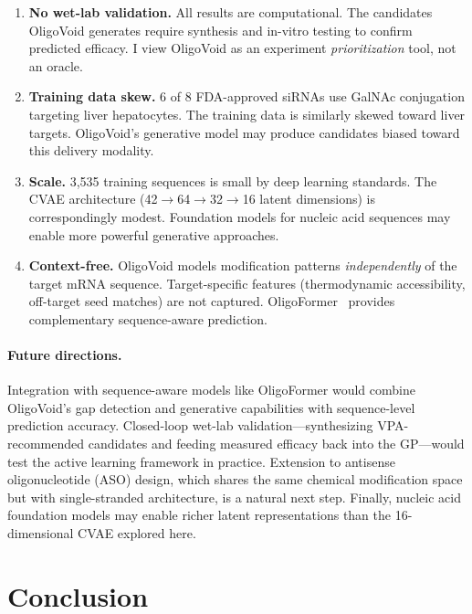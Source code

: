 \documentclass{article}
\begin{document}
\begin{enumerate}
  \item \textbf{No wet-lab validation.} All results are computational. The candidates OligoVoid generates require synthesis and in-vitro testing to confirm predicted efficacy. I view OligoVoid as an experiment \emph{prioritization} tool, not an oracle.
  \item \textbf{Training data skew.} 6 of 8 FDA-approved siRNAs use GalNAc conjugation targeting liver hepatocytes. The training data is similarly skewed toward liver targets. OligoVoid's generative model may produce candidates biased toward this delivery modality.
  \item \textbf{Scale.} 3,535 training sequences is small by deep learning standards. The CVAE architecture (42$\to$64$\to$32$\to$16 latent dimensions) is correspondingly modest. Foundation models for nucleic acid sequences may enable more powerful generative approaches.
  \item \textbf{Context-free.} OligoVoid models modification patterns \emph{independently} of the target mRNA sequence. Target-specific features (thermodynamic accessibility, off-target seed matches) are not captured. OligoFormer~\citep{oligoformer2024} provides complementary sequence-aware prediction.
\end{enumerate}

\paragraph{Future directions.}
Integration with sequence-aware models like OligoFormer would combine OligoVoid's gap detection and generative capabilities with sequence-level prediction accuracy. Closed-loop wet-lab validation---synthesizing VPA-recommended candidates and feeding measured efficacy back into the GP---would test the active learning framework in practice. Extension to antisense oligonucleotide (ASO) design, which shares the same chemical modification space but with single-stranded architecture, is a natural next step. Finally, nucleic acid foundation models may enable richer latent representations than the 16-dimensional CVAE explored here.


\section{Conclusion}
\end{document}

